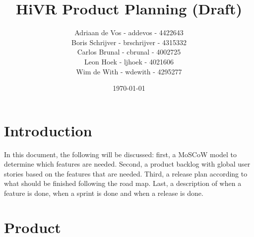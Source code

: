 \documentclass[11pt]{article}
\begin{document}
\title{HiVR Product Planning (Draft)}
\author{
	Adriaan de Vos - addevos - 4422643\\
	Boris Schrijver - brschrijver - 4315332\\
	Carlos Brunal - cbrunal - 4002725\\
	Leon Hoek - ljhoek - 4021606\\
	Wim de With - wdewith - 4295277
}
\date{\today}

\maketitle

\newpage
\tableofcontents
\newpage

\section{Introduction}
In this document, the following will be discussed: first, a MoSCoW model to determine which features are needed. Second, a product backlog with global user stories based on the features that are needed. Third, a release plan according to what should be finished following the road map. Last, a description of when a feature is done, when a sprint is done and when a release is done.

\section{Product}
\end{document}
